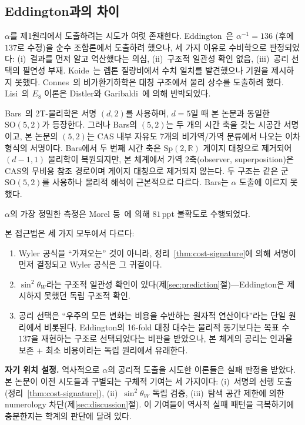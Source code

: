 \documentclass[entropy,article,submit,pdftex,oneauthor]{Definitions/mdpi}
\begin{document}
\subsection{Eddington과의 차이}

$\alpha$를 제1원리에서 도출하려는 시도가 여럿 존재한다. Eddington~\cite{eddington1946}은 $\alpha^{-1} = 136$ (후에 $137$로 수정)을 순수 조합론에서 도출하려 했으나, 세 가지 이유로 수비학으로 판정되었다: (i)~결과를 먼저 알고 역산했다는 의심, (ii)~구조적 일관성 확인 없음, (iii)~공리 선택의 필연성 부재. Koide~\cite{koide1983}는 렙톤 질량비에서 수치 일치를 발견했으나 기원을 제시하지 못했다. Connes~\cite{connes1996}의 비가환기하학은 대칭 구조에서 물리 상수를 도출하려 했다. Lisi~\cite{lisi2007}의 $E_8$ 이론은 Distler와 Garibaldi~\cite{distler2010}에 의해 반박되었다.

Bars~\cite{bars2006}의 2T-물리학은 서명 $(d,2)$를 사용하며, $d=5$일 때 본 논문과 동일한 $\mathrm{SO}(5,2)$가 등장한다. 그러나 Bars의 $(5,2)$는 두 개의 시간 축을 갖는 시공간 서명이고, 본 논문의 $(5,2)$는 CAS 내부 자유도 7개의 비가역/가역 분류에서 나오는 이차형식의 서명이다. Bars에서 두 번째 시간 축은 $\mathrm{Sp}(2,\mathbb{R})$ 게이지 대칭으로 제거되어 $(d-1,1)$ 물리학이 복원되지만, 본 체계에서 가역 2축(observer, superposition)은 CAS의 무비용 참조 경로이며 게이지 대칭으로 제거되지 않는다. 두 구조는 같은 군 $\mathrm{SO}(5,2)$를 사용하나 물리적 해석이 근본적으로 다르다. Bars는 $\alpha$ 도출에 이르지 못했다.

$\alpha$의 가장 정밀한 측정은 Morel 등~\cite{morel2020}에 의해 $81$\,ppt 불확도로 수행되었다.

본 접근법은 세 가지 모두에서 다르다:
\begin{enumerate}
\item Wyler 공식을 ``가져오는'' 것이 아니라, 정리~\ref{thm:cost-signature}에 의해 서명이 먼저 결정되고 Wyler 공식은 그 귀결이다.
\item $\sin^2\theta_W$라는 구조적 일관성 확인이 있다(제\ref{sec:prediction}절)---Eddington은 제시하지 못했던 독립 구조적 확인.
\item 공리 선택은 ``우주의 모든 변화는 비용을 수반하는 원자적 연산이다''라는 단일 원리에서 비롯된다. Eddington의 16-fold 대칭 대수는 물리적 동기보다는 목표 수 $137$을 재현하는 구조로 선택되었다는 비판을 받았으나, 본 체계의 공리는 인과율 보존 + 최소 비용이라는 독립 원리에서 유래한다.
\end{enumerate}

\textbf{자기 위치 설정.} 역사적으로 $\alpha$의 공리적 도출을 시도한 이론들은 실패 판정을 받았다. 본 논문이 이전 시도들과 구별되는 구체적 기여는 세 가지이다: (i)~서명의 선행 도출(정리~\ref{thm:cost-signature}), (ii)~$\sin^2\theta_W$ 독립 검증, (iii)~탐색 공간 제한에 의한 numerology 차단(제\ref{sec:discussion}절). 이 기여들이 역사적 실패 패턴을 극복하기에 충분한지는 학계의 판단에 달려 있다.
\end{document}
